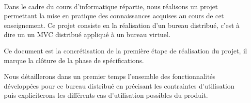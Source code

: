 \paragraph{}Dans le cadre du cours d'informatique répartie, nous réalisons un projet permettant la mise en pratique des connaissances acquises au cours de cet enseignement. Ce projet consiste en la réalisation d'un bureau distribué, c'est à dire un un MVC distribué appliqué à un bureau virtuel. 

Ce document est la concrétisation de la première étape de réalisation du projet, il marque la clôture de la phase de spécifications.

Nous détaillerons dans un premier temps l'ensemble des fonctionnalités développées pour ce bureau distribué en précisant les contraintes d'utilisation puis expliciterons les différents cas d'utilisation possibles du produit.   